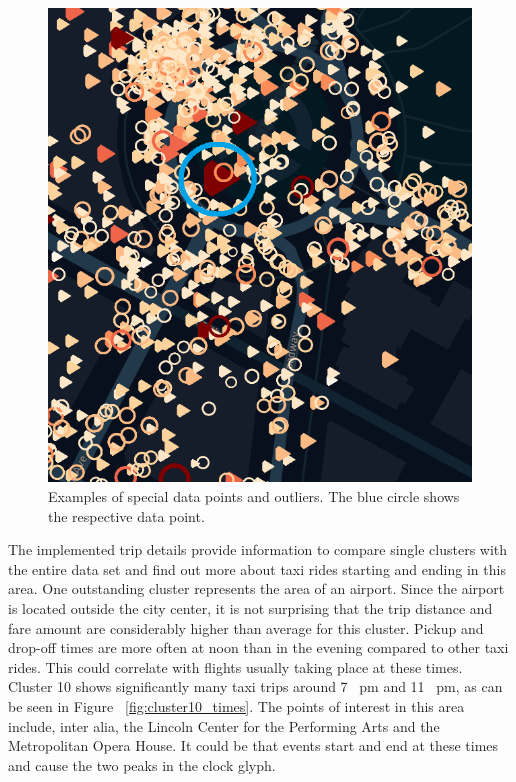 \documentclass[sigconf, authorversion, nonacm=true]{acmart}
\begin{document}
\begin{figure}[!htb]
\endminipage\hfill
{}%
  \includegraphics[width=\linewidth]{outlier_both}
\endminipage
\caption{Examples of special data points and outliers. The blue circle shows the respective data point.}
\label{fig:outliers}
\end{figure}


The implemented trip details provide information to compare single clusters with the entire data set and find out more about taxi rides starting and ending in this area. One outstanding cluster represents the area of an airport. Since the airport is located outside the city center, it is not surprising that the trip distance and fare amount are considerably higher than average for this cluster. Pickup and drop-off times are more often at noon than in the evening compared to other taxi rides. This could correlate with flights usually taking place at these times. \\
Cluster 10 shows significantly many taxi trips around 7 ~pm and 11 ~pm, as can be seen in Figure ~\ref{fig:cluster10_times}. The points of interest in this area include, inter alia, the Lincoln Center for the Performing Arts and the Metropolitan Opera House. It could be that events start and end at these times and cause the two peaks in the clock glyph. 
\end{document}
